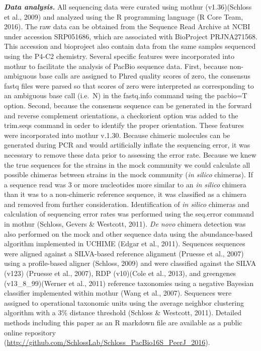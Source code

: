 \documentclass[11pt,]{article}
\begin{document}
\textbf{\emph{Data analysis.}} All sequencing data were curated using
mothur (v1.36)(Schloss et al., 2009) and analyzed using the R
programming language (R Core Team, 2016). The raw data can be obtained
from the Sequence Read Archive at NCBI under accession SRP051686, which
are associated with BioProject PRJNA271568. This accession and
bioproject also contain data from the same samples sequenced using the
P4-C2 chemistry. Several specific features were incorporated into mothur
to facilitate the analysis of PacBio sequence data. First, because
non-ambiguous base calls are assigned to Phred quality scores of zero,
the consensus fastq files were parsed so that scores of zero were
interpreted as corresponding to an ambiguous base call (i.e.~N) in the
fastq.info command using the pacbio=T option. Second, because the
consensus sequence can be generated in the forward and reverse
complement orientations, a checkorient option was added to the trim.seqs
command in order to identify the proper orientation. These features were
incorporated into mothur v.1.30. Because chimeric molecules can be
generated during PCR and would artificially inflate the sequencing
error, it was necessary to remove these data prior to assessing the
error rate. Because we knew the true sequences for the strains in the
mock community we could calculate all possible chimeras between strains
in the mock community (\emph{in silico} chimeras). If a sequence read
was 3 or more nucleotides more similar to an \emph{in silico} chimera
than it was to a non-chimeric reference sequence, it was classified as a
chimera and removed from further consideration. Identification of
\emph{in silico} chimeras and calculation of sequencing error rates was
performed using the seq.error command in mothur (Schloss, Gevers \&
Westcott, 2011). \emph{De novo} chimera detection was also performed on
the mock and other sequence data using the abundance-based algorithm
implemented in UCHIME (Edgar et al., 2011). Sequences sequences were
aligned against a SILVA-based reference alignment (Pruesse et al., 2007)
using a profile-based aligner (Schloss, 2009) and were classified
against the SILVA (v123) (Pruesse et al., 2007), RDP (v10)(Cole et al.,
2013), and greengenes (v13\_8\_99)(Werner et al., 2011) reference
taxonomies using a negative Bayesian classifier implemented within
mothur (Wang et al., 2007). Sequences were assigned to operational
taxonomic units using the average neighbor clustering algorithm with a
3\% distance threshold (Schloss \& Westcott, 2011). Detailed methods
including this paper as an R markdown file are available as a public
online repository
(\url{http://github.com/SchlossLab/Schloss_PacBio16S_PeerJ_2016}).
\end{document}
